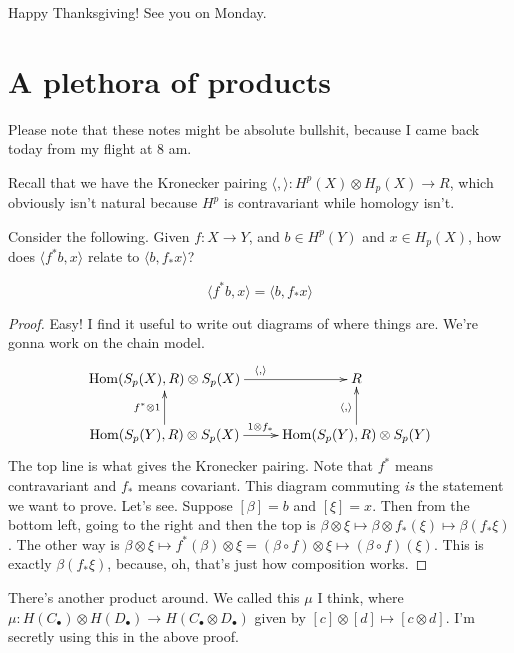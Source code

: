 Happy Thanksgiving! See you on Monday.
\section{A plethora of products}
\begin{remark}
Please note that these notes might be absolute bullshit, because I came back today from my flight at 8 am.
\end{remark}
Recall that we have the Kronecker pairing $\langle ,\rangle: H^p(X)\otimes H_p(X)\to R$, which obviously isn't natural because $ H^p$ is contravariant while homology isn't.

Consider the following. Given $f:X\to Y$, and $b\in H^p(Y)$ and $x\in H_p(X)$, how does $\langle f^\ast b,x\rangle$ relate to $\langle b,f_\ast x\rangle$?
\begin{claim}
$$\langle f^\ast b,x\rangle=\langle b,f_\ast x\rangle$$
\end{claim}
\begin{proof}
Easy! I find it useful to write out diagrams of where things are. We're gonna work on the chain model.
\begin{equation*}
	\xymatrix{
	\Hom(S_p(X),R)\otimes S_p(X)\ar[r]^{\langle,\rangle} & R\\
	\Hom(S_p(Y),R)\otimes S_p(X)\ar[r]^{1\otimes f_\ast}\ar[u]^{f^\ast\otimes 1} & \Hom(S_p(Y),R)\otimes S_p(Y)\ar[u]^{\langle,\rangle}
	}
\end{equation*}
The top line is what gives the Kronecker pairing. Note that $f^\ast$ means contravariant and $f_\ast$ means covariant. This diagram commuting \emph{is} the statement we want to prove. Let's see. Suppose $[\beta]=b$ and $[\xi]=x$. Then from the bottom left, going to the right and then the top is $\beta\otimes\xi\mapsto\beta\otimes f_\ast(\xi)\mapsto\beta(f_\ast\xi)$. The other way is $\beta\otimes\xi\mapsto f^\ast(\beta)\otimes\xi=(\beta\circ f)\otimes\xi\mapsto(\beta\circ f)(\xi)$. This is exactly $\beta(f_\ast\xi)$, because, oh, that's just how composition works.
\end{proof}
There's another product around. We called this $\mu$ I think, where $\mu:H(C_\bullet)\otimes H(D_\bullet)\to H(C_\bullet\otimes D_\bullet)$ given by $[c]\otimes [d]\mapsto[c\otimes d]$. I'm secretly using this in the above proof.

